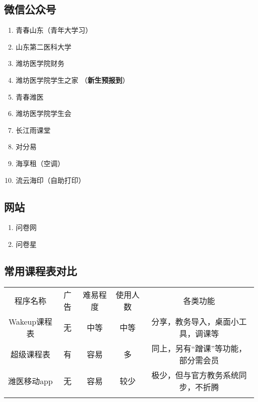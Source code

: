 {\begin{minipage}{.5\textwidth}
        \subsection[微信公众号]{微信公众号}
        \begin{enumerate}
            \item 青春山东（青年大学习）
            \item 山东第二医科大学
            \item 潍坊医学院财务
            \item 潍坊医学院学生之家
                  （\textbf{新生预报到}）
            \item 青春潍医
            \item 潍坊医学院学生会
            \item 长江雨课堂
            \item 对分易
            \item 海享租（空调）
            \item 流云海印（自助打印）
        \end{enumerate}

        \subsection[网站]{网站}
        \begin{enumerate}
            \item 问卷网
            \item 问卷星
        \end{enumerate}
    \end{minipage}
    \vspace*{-1em}
}

\subsection[常用课程表对比]{常用课程表对比}
\label{schedule}
\begin{center}
    \centering
    \begin{tabular}{|c|c|c|c|c|}
        \Xhline{1.2pt}
        程序名称      & 广告 & 难易程度 & 使用人数 & 各类功能                \\
        \Xhline{1.2pt}
        Wakeup课程表 & 无  & 中等   & 中等   & 分享，教务导入，桌面小工具，调课等 \\
        \hline
        超级课程表     & 有  & 容易   & 多    & 同上，另有“蹭课”等功能，部分需会员  \\
        \hline
        潍医移动app   & 无  & 容易   & 较少   & 极少，但与官方教务系统同步，不折腾   \\
        \Xhline{1.2pt}
    \end{tabular}
\end{center}

